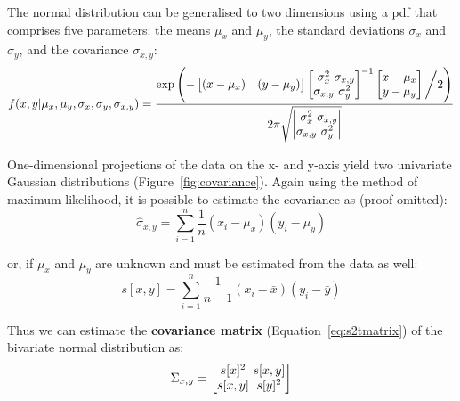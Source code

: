 \begin{refsection}
The normal distribution can be generalised to two dimensions using a
pdf that comprises five parameters: the means $\mu_x$ and $\mu_y$, the
standard deviations $\sigma_x$ and $\sigma_y$, and the covariance
$\sigma_{x,y}$:
\begin{equation}
f(x,y|\mu_x,\mu_y,\sigma_x,\sigma_y,\sigma_{x,y}) = \frac{
\exp\left(-
\left[\begin{array}{@{}cc@{}}
(x-\mu_x) & (y-\mu_y)
\end{array}\right]
\left[\begin{array}{@{}c@{}c@{}}
\sigma^2_x & \sigma_{x,y}\\
\sigma_{x,y} & \sigma^2_y
\end{array}\right]^{-1}
\left[\begin{array}{@{}c@{}}
x-\mu_x\\
y-\mu_y
\end{array}\right] \biggl/ 2
\right)
}{2\pi\sqrt{
\left|\begin{array}{@{}c@{}c@{}}
\sigma^2_x & \sigma_{x,y}\\
\sigma_{x,y} & \sigma^2_y
\end{array}\right|
}}
\label{eq:2dgauss}
\end{equation}

One-dimensional projections of the data on the x- and y-axis yield two
univariate Gaussian distributions (Figure~\ref{fig:covariance}).
Again using the method of maximum likelihood, it is possible to
estimate the covariance as (proof omitted):
\begin{equation}
  \hat{\sigma}_{x,y} = \sum\limits_{i=1}^{n}\frac{1}{n}(x_i-\mu_x)(y_i-\mu_y)
\end{equation}

\noindent or, if $\mu_x$ and $\mu_y$ are unknown and must be estimated
from the data as well:
\begin{equation}
  s[x,y] = \sum\limits_{i=1}^{n}\frac{1}{n-1}(x_i-\bar{x})(y_i-\bar{y})
  \label{eq:sxy}
\end{equation}

Thus we can estimate the \textbf{covariance matrix}
(Equation~\ref{eq:s2tmatrix}) of the bivariate normal distribution as:
\begin{equation}
  \Sigma_{x,y} =
  \left[
    \begin{array}{@{}c@{~}c@{}}
      s[x]^2 & s[x,y]\\
      s[x,y] & s[y]^2
    \end{array}
    \right]
\end{equation}


\end{refsection}
